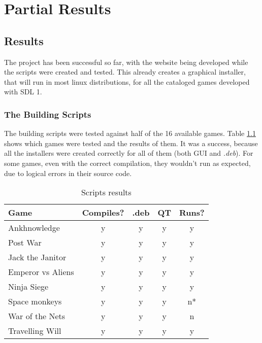 \chapter[Partial Results]{Partial Results}

\section[Results]{Results}

The project has been successful so far, with the website being developed while the scripts were created and tested. This already creates a graphical installer, that will run in most linux distributions, for all the cataloged games developed with SDL 1.

\subsection[The Building Scripts]{The Building Scripts}

The building scripts were tested against half of the 16 available games. Table \ref{tab:script_games} shows which games were tested and the results of them. It was a success, because all the installers were created correctly for all of them (both GUI and \textit{.deb}). For some games, even with the correct compilation, they wouldn't run as expected, due to logical errors in their source code.

\begin{table}[h!]
\centering
\caption{Scripts results}
\label{tab:script_games}
\begin{tabular}{lcccc}
\hline
\textbf{Game} & \multicolumn{1}{l}{\textbf{Compiles?}} & \multicolumn{1}{l}{\textbf{.deb}} & \multicolumn{1}{l}{\textbf{QT}} & \multicolumn{1}{l}{\textbf{Runs?}} \\ \hline
Ankhnowledge & y & y & y & y \\
Post War & y & y & y & y \\
Jack the Janitor & y & y & y & y \\
Emperor vs Aliens & y & y & y & y \\
Ninja Siege & y & y & y & y \\
Space monkeys & y & y & y & n* \\
War of the Nets & y & y & y & n \\
Travelling Will & y & y & y & y \\ \hline
\end{tabular}
\end{table}

